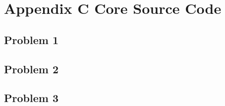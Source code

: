 \documentclass{apmcmthesis}
\begin{document}
\section*{ Appendix C Core Source Code}
\setcounter{subsection}{0}
\renewcommand{\thesubsection}{C.\arabic{subsection}}
\renewcommand{\theHsubsection}{C.\arabic{subsection}}
\subsection{Problem 1}
\subsection{Problem 2}
\subsection{Problem 3}
\end{document}
